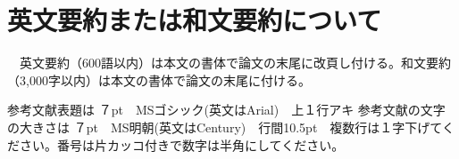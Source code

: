 \documentclass[base=11pt,magstyle=real,a4paper,twocolumn,xelatex,pandoc,jafont=ms]{bxjsarticle}
\begin{document}
\section{英文要約または和文要約について}
　英文要約（600語以内）は本文の書体で論文の末尾に改頁し付ける。和文要約（3,000字以内）は本文の書体で論文の末尾に付ける。

\vspace{1\Cvs}
\begin{thebibliography}{9}
		参考文献表題は ７pt　MSゴシック(英文はArial)　上１行アキ
		参考文献の文字の大きさは ７pt　MS明朝(英文はCentury)　行間10.5pt　複数行は１字下げてください。番号は片カッコ付きで数字は半角にしてください。

\end{thebibliography}
\vspace{1\Cvs}
\theendnotes
\makeaffiliation
\end{document}
